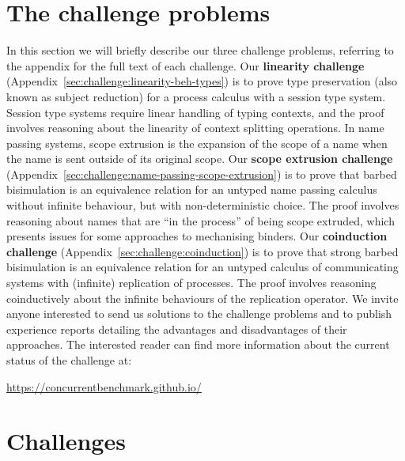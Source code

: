 \documentclass[submission,copyright,creativecommons]{eptcs}
\begin{document}
\section{The challenge problems}
In this section we will briefly describe our three challenge problems, referring to the appendix for the full text of each challenge.
Our \textbf{linearity challenge} (Appendix~\ref{sec:challenge:linearity-beh-types}) is to prove type preservation (also known as subject reduction) for a process calculus with a session type system.
Session type systems require linear handling of typing contexts, and the proof involves reasoning about the linearity of context splitting operations.
In name passing systems, scope extrusion is the expansion of the scope of a name when the name is sent outside of its original scope.
Our \textbf{scope extrusion challenge} (Appendix~\ref{sec:challenge:name-passing-scope-extrusion}) is to prove that barbed bisimulation is an equivalence relation for an untyped name passing calculus without infinite behaviour, but with non-deterministic choice.
The proof involves reasoning about names that are ``in the process'' of being scope extruded, which presents issues for some approaches to mechanising binders.
Our \textbf{coinduction challenge} (Appendix~\ref{sec:challenge:coinduction}) is to prove that strong barbed bisimulation is an equivalence relation for an untyped calculus of communicating systems with (infinite) replication of processes.
The proof involves reasoning coinductively about the infinite behaviours of the replication operator.
We invite anyone interested to send us solutions to the challenge problems and to publish experience reports detailing the advantages and disadvantages of their approaches.
The interested reader can find more information about the current status of the challenge at:
\begin{center}
  \url{https://concurrentbenchmark.github.io/}
\end{center}




\appendix

\section{Challenges}

\end{document}
